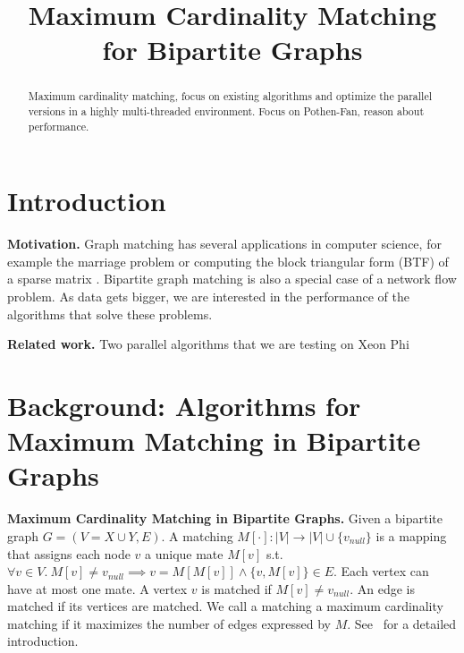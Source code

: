\documentclass[letterpaper]{article}
\title{Maximum Cardinality Matching for Bipartite Graphs}
\newcommand{\mypar}[1]{{\bf #1.}}
\begin{document}
%
\maketitle
%


\begin{abstract}

Maximum cardinality matching, focus on existing algorithms and optimize the parallel versions in a highly multi-threaded environment. Focus on Pothen-Fan, reason about performance.

\end{abstract}

\section{Introduction}\label{sec:intro}

\mypar{Motivation} Graph matching has several applications in computer science, for example the marriage problem or computing the block triangular form (BTF) of a sparse matrix \cite{Pothen:1990}. Bipartite graph matching is also a special case of a network flow problem. As data gets bigger, we are interested in the performance of the algorithms that solve these problems.

\mypar{Related work} Two parallel algorithms that we are testing on Xeon Phi \cite{Azad:2012} \cite{Azad:2015} 


\section{Background: Algorithms for Maximum Matching in Bipartite Graphs}\label{sec:background}

\mypar{Maximum Cardinality Matching in Bipartite Graphs}
Given a bipartite graph $G = (V = X \cup Y, E)$.
A matching $M[\cdot]: |V| \rightarrow |V| \cup \{v_{null}\}$ is a mapping that assigns each node $v$ a unique mate $M[v]$ s.t. 
$\forall v \in V.\ M[v] \neq v_{null} \implies v = M[M[v]] \wedge \{v, M[v]\} \in E$.
Each vertex can have at most one mate. A vertex $v$ is matched if $M[v] \neq v_{null}$. An edge is matched if its vertices are matched. 
We call a matching a maximum cardinality matching if it maximizes the number of edges expressed by $M$. See~\cite{intro_alg} for a detailed introduction.
\end{document}
